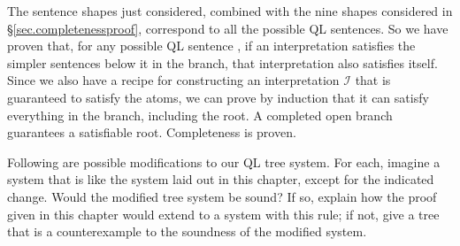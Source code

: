 The sentence shapes just considered, combined with the nine shapes considered in \S\ref{sec.completenessproof}, correspond to all the possible QL sentences. So we have proven that, for any possible QL sentence \metaA{}, if an interpretation satisfies the simpler sentences below it in the branch, that interpretation also satisfies \metaA{} itself. Since we also have a recipe for constructing an interpretation $\mathcal{I}$ that is guaranteed to satisfy the atoms, we can prove by induction that it can satisfy everything in the branch, including the root. A completed open branch guarantees a satisfiable root. Completeness is proven.

\practiceproblems

\solutions
\problempart
\label{pr.QLalttrees-sound}
Following are possible modifications to our QL tree system. For each, imagine a system that is like the system laid out in this chapter, except for the indicated change. Would the modified tree system be sound? If so, explain how the proof given in this chapter would extend to a system with this rule; if not, give a tree that is a counterexample to the soundness of the modified system.
